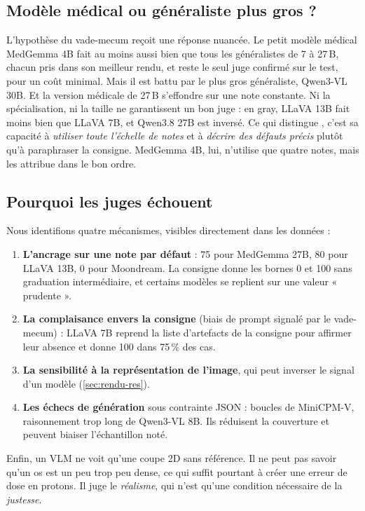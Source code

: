 \documentclass[11pt,a4paper]{article}
\begin{document}
\subsection{Modèle médical ou généraliste plus gros ?}
L'hypothèse du vade-mecum reçoit une réponse nuancée. Le petit modèle médical MedGemma 4B fait au moins aussi bien que tous les généralistes de 7 à 27\,B, chacun pris dans son meilleur rendu, et reste le seul juge confirmé sur le test, pour un coût minimal. Mais il est battu par le plus gros généraliste, Qwen3-VL 30B. Et la version médicale de 27\,B s'effondre sur une note constante. Ni la spécialisation, ni la taille ne garantissent un bon juge : en gray, LLaVA 13B fait moins bien que LLaVA 7B, et Qwen3.8 27B est inversé. Ce qui distingue \bestVal{}, c'est sa capacité à \emph{utiliser toute l'échelle de notes} et à \emph{décrire des défauts précis} plutôt qu'à paraphraser la consigne. MedGemma 4B, lui, n'utilise que quatre notes, mais les attribue dans le bon ordre.

\subsection{Pourquoi les juges échouent}
Nous identifions quatre mécanismes, visibles directement dans les données :
\begin{enumerate}
  \item \textbf{L'ancrage sur une note par défaut} : 75 pour MedGemma 27B, 80 pour LLaVA 13B, 0 pour Moondream. La consigne donne les bornes 0 et 100 sans graduation intermédiaire, et certains modèles se replient sur une valeur « prudente ».
  \item \textbf{La complaisance envers la consigne} (biais de prompt signalé par le vade-mecum) : LLaVA 7B reprend la liste d'artefacts de la consigne pour affirmer leur absence et donne 100 dans 75\,\% des cas.
  \item \textbf{La sensibilité à la représentation de l'image}, qui peut inverser le signal d'un modèle (\cref{sec:rendu-res}).
  \item \textbf{Les échecs de génération} sous contrainte JSON : boucles de MiniCPM-V, raisonnement trop long de Qwen3-VL 8B. Ils réduisent la couverture et peuvent biaiser l'échantillon noté.
\end{enumerate}
Enfin, un VLM ne voit qu'une coupe 2D sans référence. Il ne peut pas savoir qu'un os est un peu trop peu dense, ce qui suffit pourtant à créer une erreur de dose en protons. Il juge le \emph{réalisme}, qui n'est qu'une condition nécessaire de la \emph{justesse}.
\end{document}
